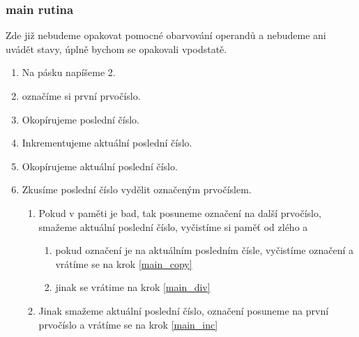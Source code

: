 \documentclass[a4paper,12pt]{article} %
\begin{document}
\subsubsection*{main rutina}

Zde již nebudeme opakovat pomocné obarvování operandů a nebudeme ani uvádět stavy, úplně bychom se opakovali vpodstatě.

\begin{enumerate}
    \item Na pásku napíšeme 2.
    \item \label{main_copy} označíme si první prvočíslo.
    \item Okopírujeme poslední číslo.
    \item \label{main_inc} Inkrementujeme aktuální poslední číslo.
    \item \label{main_div} Okopírujeme aktuální poslední číslo.
    \item Zkusíme poslední číslo vydělit označeným prvočíslem.
          \begin{enumerate}
              \item Pokud v paměti je bad, tak posuneme označení na další prvočíslo, smažeme aktuální poslední číslo, vyčistíme si paměť od zlého a
                    \begin{enumerate}
                        \item pokud označení je na aktuálním posledním čísle, vyčistíme označení a vrátíme se na krok \ref{main_copy}
                        \item jinak se vrátime na krok \ref{main_div}
                    \end{enumerate}
              \item Jinak smažeme aktuální poslední číslo, označení posuneme na první prvočíslo a vrátíme se na krok \ref{main_inc}
          \end{enumerate}
\end{enumerate}
\end{document}

